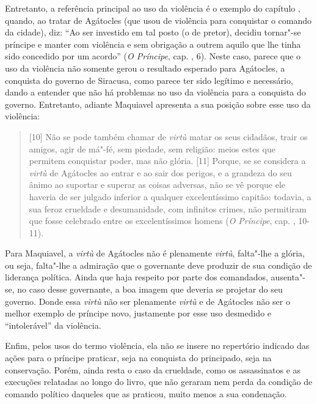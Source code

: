 Entretanto, a referência principal ao uso da violência é o exemplo do
capítulo , quando, ao tratar de Agátocles (que usou de violência
para conquistar o comando da cidade), diz: ``Ao ser investido em tal
posto (o de pretor), decidiu tornar"-se príncipe e manter com violência e
sem obrigação a outrem aquilo que lhe tinha sido concedido por um
acordo'' (\emph{O Príncipe}, cap. , 6). Neste caso, parece
que o uso da violência não somente gerou o resultado esperado para
Agátocles, a conquista do governo de Siracusa, como parece ter sido
legítimo e necessário, dando a entender que não há problemas no uso da
violência para a conquista do governo. Entretanto, adiante Maquiavel
apresenta a sua posição sobre esse uso da violência:

\begin{quote}
{[}10{]} Não se pode também chamar de \emph{virtù} matar os
seus cidadãos, trair os amigos, agir de má"-fé, sem piedade, sem
religião: meios estes que permitem conquistar poder, mas não glória.
{[}11{]} Porque, se se considera a \emph{virtù} de Agátocles ao entrar e
ao sair dos perigos, e a grandeza do seu ânimo ao suportar e superar as
coisas adversas, não se vê porque ele haveria de ser julgado inferior a
qualquer excelentíssimo capitão: todavia, a sua feroz crueldade e
desumanidade, com infinitos crimes, não permitiram que fosse celebrado
entre os excelentíssimos homens (\emph{O Príncipe}, cap. , 10-11).
\end{quote}

Para Maquiavel, a \emph{virtù} de Agátocles não é plenamente
\emph{virtù}, falta"-lhe a glória, ou seja, falta"-lhe a admiração que o
governante deve produzir de sua condição de liderança política. Ainda
que haja respeito por parte dos comandados, ausenta"-se, no caso desse
governante, a boa imagem que deveria se projetar do seu governo. Donde
essa \emph{virtù} não ser plenamente \emph{virtù} e de Agátocles não ser
o melhor exemplo de príncipe novo, justamente por esse uso desmedido e
``intolerável'' da violência.

Enfim, pelos usos do termo violência, ela não se insere no repertório
indicado das ações para o príncipe praticar, seja na conquista do
principado, seja na conservação. Porém, ainda resta o caso da crueldade,
como os assassinatos e as execuções relatadas ao longo do livro, que não
geraram nem perda da condição de comando político daqueles que as
praticou, muito menos a sua condenação.

